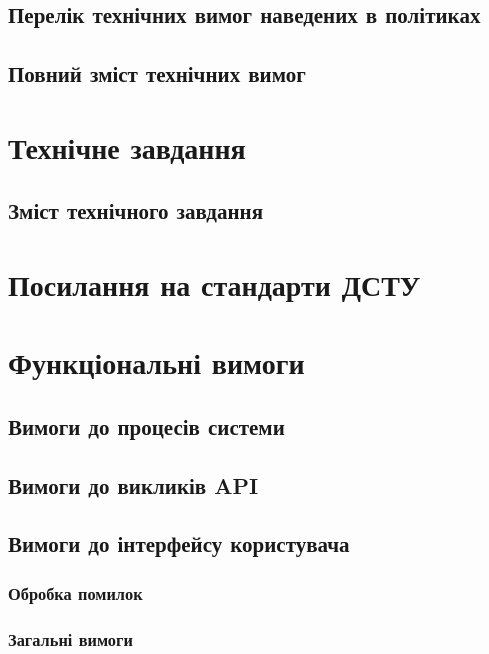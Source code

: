 \subsection{Перелік технічних вимог наведених в політиках}

\subsection{Повний зміст технічних вимог}

\section{Технічне завдання}

\subsection*{Зміст технічного завдання}

\section{Посилання на стандарти ДСТУ}

\newpage
\section{Функціональні вимоги}

\subsection{Вимоги до процесів системи}

\subsection{Вимоги до викликів API}

\subsection{Вимоги до інтерфейсу користувача}

\subsubsection{Обробка помилок}

\subsubsection{Загальні вимоги}

